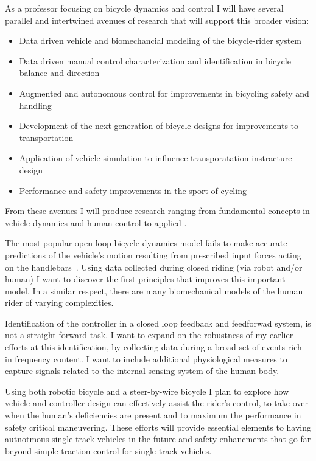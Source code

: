 \documentclass{article}
\begin{document}
As a professor focusing on bicycle dynamics and control I will have several
parallel and intertwined avenues of research that will support this broader
vision:
%
\begin{itemize}
  \item Data driven vehicle and biomechancial modeling of the bicycle-rider
    system
  \item Data driven manual control characterization and identification in bicycle
    balance and direction
  \item Augmented and autonomous control for improvements in bicycling safety
    and handling
  \item Development of the next generation of bicycle designs for improvements
    to transportation
  \item Application of vehicle simulation to influence transporatation
    instracture design
  \item Performance and safety improvements in the sport of cycling
\end{itemize}

From these avenues I will produce research ranging from fundamental concepts in
vehicle dynamics and human control to applied .

The most popular open loop bicycle dynamics model fails to make accurate
predictions of the vehicle's motion resulting from prescribed input forces
acting on the handlebars~\cite{Moore2013a}. Using data collected during closed
riding (via robot and/or human) I want to discover the first principles
that improves this important model. In a similar respect, there are
many biomechanical models of the human rider of varying complexities.

Identification of the controller in a closed loop feedback and feedforwad
system, is not a straight forward task. I want to expand on the robustness of
my earlier efforts at this identification, by collecting data during a broad
set of events rich in frequency content. I want to include additional
physiological measures to capture signals related to the internal sensing
system of the human body.

Using both robotic bicycle and a steer-by-wire bicycle I plan to explore how
vehicle and controller design can effectively assist the rider's control, to
take over when the human's deficiencies are present and to maximum the
performance in safety critical maneuvering. These efforts will provide
essential elements to having autnotmous single track vehicles in the future and
safety enhancments that go far beyond simple traction control for single track
vehicles.
\end{document}
